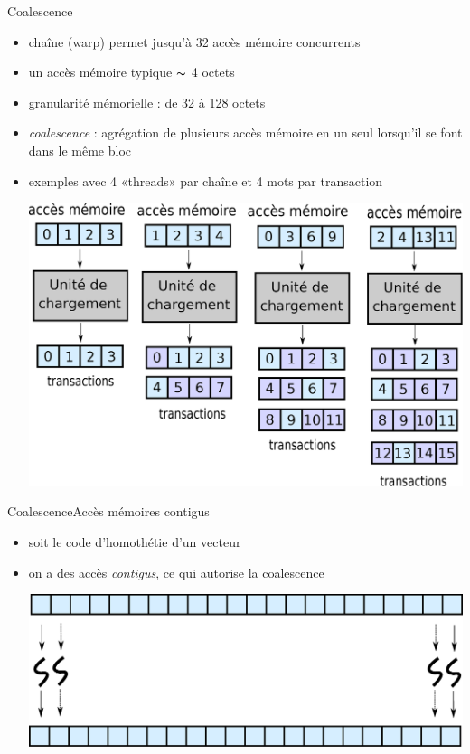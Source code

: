 \documentclass[11pt,mathserif]{beamer}
\newcommand{\argi}{\faLightbulbO}
\newcommand{\adibi}{\faCommentO}
\newcommand{\harritu}{\faExclamation}
\newcommand{\extcu}{cu}
\newcommand{\extcu}{cuf}
\newcommand{\includeSrcCu}[1]{}
\begin{document}
\begin{frame}{Coalescence}
  \begin{itemize}[<+->]
    \item[\argi] chaîne (warp) permet jusqu'à 32 accès mémoire concurrents
    \item[\argi] un accès mémoire typique $\thicksim$ 4 octets
    \item[\argi] granularité mémorielle : de 32 à 128 octets 
    \item[\harritu] {\em coalescence} : agrégation de plusieurs accès mémoire en un seul lorsqu'il se font dans le même bloc
    \item[\adibi] exemples avec 4 «threads» par chaîne et 4 mots par transaction
\begin{center}
\includegraphics[width=0.6\linewidth]{fig/coalescence.eps}
\end{center}
  \end{itemize}
\end{frame}

\begin{frame}{Coalescence}{Accès mémoires contigus}
  \begin{itemize}[<+->]
    \item[\adibi] soit le code d'homothétie d'un vecteur
\begin{center}
\includeSrcCu{code/scale}
\end{center}
    \item[\argi] on a des accès {\em contigus}, ce qui autorise la coalescence
\begin{center}
  \vspace{0.5cm}
\includegraphics[width=0.8\linewidth]{fig/coalScale.eps}
\end{center}
  \end{itemize}
\end{frame}
\end{document}
